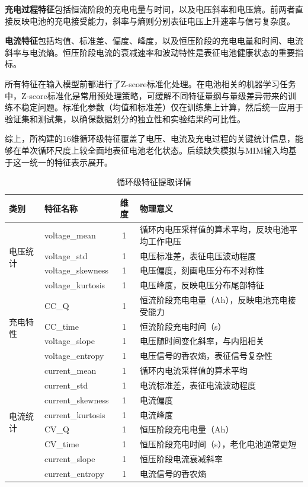\documentclass[10pt,a4paper]{ctexart}
\begin{document}
\textbf{充电过程特征}包括恒流阶段的充电电量与时间，以及电压斜率和电压熵。前两者直接反映电池的充电接受能力，斜率与熵则分别表征电压上升速率与信号复杂度。

\textbf{电流特征}包括均值、标准差、偏度、峰度，以及恒压阶段的充电电量和时间、电流斜率与电流熵。恒压阶段电流的衰减速率和波动特性是表征电池健康状态的重要指标。

所有特征在输入模型前都进行了Z-score标准化处理。在电池相关的机器学习任务中，Z-score标准化是常用预处理策略，可缓解不同特征量纲与量级差异带来的训练不稳定问题\cite{xue2024batteryml}。标准化参数（均值和标准差）仅在训练集上计算，然后统一应用于验证集和测试集，以确保数据划分的独立性和实验结果的可比性。

综上，所构建的16维循环级特征覆盖了电压、电流及充电过程的关键统计信息，能够在单次循环尺度上较全面地表征电池老化状态。后续缺失模拟与MIM输入均基于这一统一的特征表示展开。

\begin{table}[H]
\centering
\caption{循环级特征提取详情}
\label{tab:features}
\begin{tabular}{@{}llcp{6cm}@{}}
\toprule
\textbf{类别} & \textbf{特征名称} & \textbf{维度} & \textbf{物理意义} \\
\midrule
\multirow{4}{*}{电压统计} 
& voltage\_mean & 1 & 循环内电压采样值的算术平均，反映电池平均工作电压 \\
& voltage\_std & 1 & 电压标准差，表征电压波动程度 \\
& voltage\_skewness & 1 & 电压偏度，刻画电压分布不对称性 \\
& voltage\_kurtosis & 1 & 电压峰度，反映电压分布尾部特征 \\
\midrule
\multirow{4}{*}{充电特性} 
& CC\_Q & 1 & 恒流阶段充电电量（Ah），反映电池充电接受能力 \\
& CC\_time & 1 & 恒流阶段充电时间（s） \\
& voltage\_slope & 1 & 电压随时间变化斜率，与内阻相关 \\
& voltage\_entropy & 1 & 电压信号的香农熵，表征信号复杂性 \\
\midrule
\multirow{8}{*}{电流统计} 
& current\_mean & 1 & 循环内电流采样值的算术平均 \\
& current\_std & 1 & 电流标准差，表征电流波动程度 \\
& current\_skewness & 1 & 电流偏度 \\
& current\_kurtosis & 1 & 电流峰度 \\
& CV\_Q & 1 & 恒压阶段充电电量（Ah） \\
& CV\_time & 1 & 恒压阶段充电时间（s），老化电池通常更短 \\
& current\_slope & 1 & 恒压阶段电流衰减斜率 \\
& current\_entropy & 1 & 电流信号的香农熵 \\
\bottomrule
\end{tabular}
\end{table}
\end{document}
